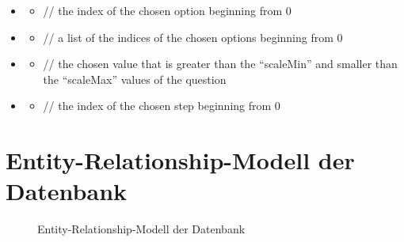 \documentclass[a4paper]{scrreprt}
\begin{document}
\begin{itemize}
                    \item {}
                        \begin{itemize}
                            \item {}
                                \par // the index of the chosen option beginning from 0
                        \end{itemize}
                        
                   \item {}
                       \begin{itemize}
                           \item {}
                               \par // a list of the indices of the chosen options beginning from 0
                       \end{itemize}
                       
                    \item {}
                        \begin{itemize}
                            \item {}
                                \par // the chosen value that is greater than the “scaleMin” and smaller than the “scaleMax” values of the question
                        \end{itemize}
                        
                    \item {}
                        \begin{itemize}
                            \item {}
                                \par // the index of the chosen step beginning from 0
                        \end{itemize}

            \end{itemize}

        \newpage
        \section{Entity-Relationship-Modell der Datenbank}
            \begin{figure}[ht]
                \centering
                \caption{Entity-Relationship-Modell der Datenbank}
            \end{figure}
\end{document}

